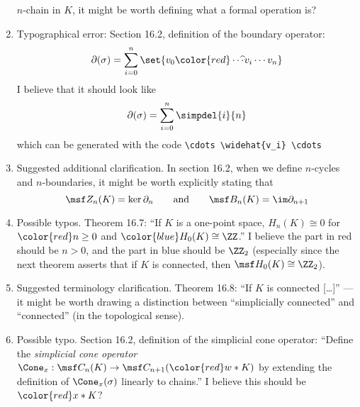 \documentclass{fkletter}
\begin{document}
\begin{enumerate}
    $n$-chain in $K$, it might be worth defining what a formal operation is?
  \item Typographical error: Section 16.2, definition of the boundary operator:
    \[
      \partial(\sigma) = \sum_{i=0}^n \set{v_0 {\color{red}\cdots\hspace{-.16cm}
          \widehat{\ } v_i} \cdots v_n}
    \]
    I believe that it should look like
    \[
      \partial(\sigma) = \sum_{i=0}^n \simpdel{i}{n}
    \]
    which can be generated with the code \verb|\cdots \widehat{v_i} \cdots|

  \item Suggested additional clarification. In section 16.2, when we define
    $n$-cycles and $n$-boundaries, it might be worth explicitly stating that
    \[
      \msf Z_n(K) = \ker \partial_n \qquad \text{and} \qquad \msf B_n(K) =
      \im\partial_{n+1}
    \]
  \item Possible typos. Theorem 16.7: ``If $K$ is a one-point space, $H_n(K)
    \cong 0$ for $\color{red} n \geq 0$ and $\color{blue}H_0(K) \cong \ZZ$.'' I
    believe the part in red should be $n > 0$, and the part in blue should be
    $\ZZ_2$ (especially since the next theorem asserts that if $K$ is connected,
    then $\msf H_0(K) \cong \ZZ_2$).
  \item Suggested terminology clarification. Theorem 16.8: ``If $K$ is
    {\color{red} connected} [\ldots]'' --- it might be worth drawing a
    distinction between ``simplicially connected'' and ``connected'' (in the
    topological sense).
  \item Possible typo. Section 16.2, definition of the simplicial cone operator:
    ``Define the \emph{simplicial cone operator} $\Cone_x : \msf C_n(K) \to \msf
    C_{n+1}({\color{red}w*K})$ by extending the definition of $\Cone_x(\sigma)$
    linearly to chains.'' I believe this should be ${\color{red}x * K}$?
\end{enumerate}
\end{document}
